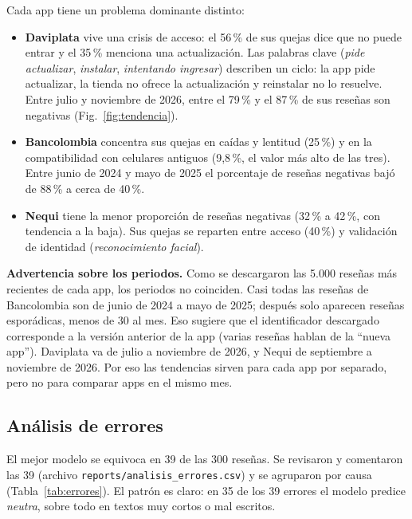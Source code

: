 \documentclass[conference]{IEEEtran}
\begin{document}
Cada app tiene un problema dominante distinto:
\begin{itemize}
\item \textbf{Daviplata} vive una crisis de acceso: el 56\,\% de sus quejas dice que no puede entrar y el 35\,\% menciona
una actualización. Las palabras clave (\emph{pide actualizar}, \emph{instalar}, \emph{intentando ingresar}) describen un
ciclo: la app pide actualizar, la tienda no ofrece la actualización y reinstalar no lo resuelve. Entre julio y noviembre
de 2026, entre el 79\,\% y el 87\,\% de sus reseñas son negativas (Fig.~\ref{fig:tendencia}).
\item \textbf{Bancolombia} concentra sus quejas en caídas y lentitud (25\,\%) y en la compatibilidad con celulares
antiguos (9,8\,\%, el valor más alto de las tres). Entre junio de 2024 y mayo de 2025 el porcentaje de reseñas
negativas bajó de 88\,\% a cerca de 40\,\%.
\item \textbf{Nequi} tiene la menor proporción de reseñas negativas (32\,\% a 42\,\%, con tendencia a la baja).
Sus quejas se reparten entre acceso (40\,\%) y validación de identidad (\emph{reconocimiento facial}).
\end{itemize}

\textbf{Advertencia sobre los periodos.} Como se descargaron las 5.000 reseñas más recientes de cada app, los
periodos no coinciden. Casi todas las reseñas de Bancolombia son de junio de 2024 a mayo de 2025; después solo
aparecen reseñas esporádicas, menos de 30 al mes. Eso sugiere que el identificador descargado corresponde a la
versión anterior de la app (varias reseñas hablan de la ``nueva app''). Daviplata va de julio a noviembre de 2026,
y Nequi de septiembre a noviembre de 2026. Por eso las tendencias sirven para cada app por
separado, pero no para comparar apps en el mismo mes.
\subsection{Análisis de errores}
El mejor modelo se equivoca en 39 de las 300 reseñas. Se revisaron y comentaron las 39 (archivo
\texttt{reports/analisis\_errores.csv}) y se agruparon por causa (Tabla~\ref{tab:errores}). El patrón es claro: en
35 de los 39 errores el modelo predice \emph{neutra}, sobre todo en textos muy cortos o mal escritos.
\end{document}
